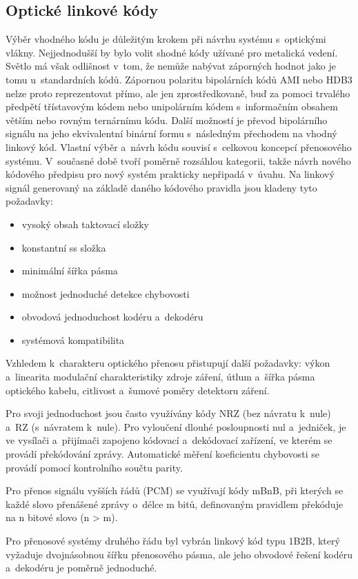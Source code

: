 \subsection{Optické linkové kódy}
Výběr vhodného kódu je důležitým krokem při návrhu systému s~optickými vlákny. Nejjednodušší by bylo volit shodné kódy užívané pro metalická vedení. Světlo má však odlišnost v~tom, že nemůže nabývat záporných hodnot jako je tomu u~standardních kódů. Zápornou polaritu bipolárních kódů AMI nebo HDB3 nelze proto reprezentovat přímo, ale jen zprostředkovaně, buď za pomoci trvalého předpětí třístavovým kódem nebo unipolárním kódem s~informačním obsahem větším nebo rovným ternárnímu kódu. Další možností je převod bipolárního signálu na jeho ekvivalentní binární formu s~následným přechodem na vhodný linkový kód. Vlastní výběr a~návrh kódu souvisí s~celkovou koncepcí přenosového systému. V~současné době tvoří poměrně rozsáhlou kategorii, takže návrh nového kódového předpisu pro nový systém prakticky nepřipadá v~úvahu. Na linkový signál generovaný na základě daného kódového pravidla jsou kladeny tyto požadavky:
\begin{itemize}
  \item vysoký obsah taktovací složky
  \item konstantní ss složka
  \item minimální šířka pásma
  \item možnost jednoduché detekce chybovosti
  \item obvodová jednoduchost kodéru a~dekodéru
  \item systémová kompatibilita
\end{itemize}
Vzhledem k~charakteru optického přenosu přistupují další požadavky: výkon a~linearita modulační charakteristiky zdroje záření, útlum a~šířka pásma optického kabelu, citlivost
a~šumové poměry detektoru záření.

Pro svoji jednoduchost jsou často využívány kódy NRZ (bez návratu k~nule) a~RZ (s~návratem k~nule). Pro vyloučení dlouhé posloupnosti nul a~jedniček, je ve vysílači a~přijímači zapojeno kódovací a~dekódovací zařízení, ve kterém se provádí překódování zprávy. Automatické měření koeficientu chybovosti se provádí pomocí kontrolního součtu parity.

Pro přenos signálu vyšších řádů (PCM) se využívají kódy mBnB, při kterých se každé slovo přenášené zprávy o~délce m bitů, definovaným pravidlem překóduje na n bitové slovo (n > m).

Pro přenosové systémy druhého řádu byl vybrán linkový kód typu 1B2B, který vyžaduje dvojnásobnou šířku přenosového pásma, ale jeho obvodové řešení kodéru a~dekodéru je poměrně jednoduché.

